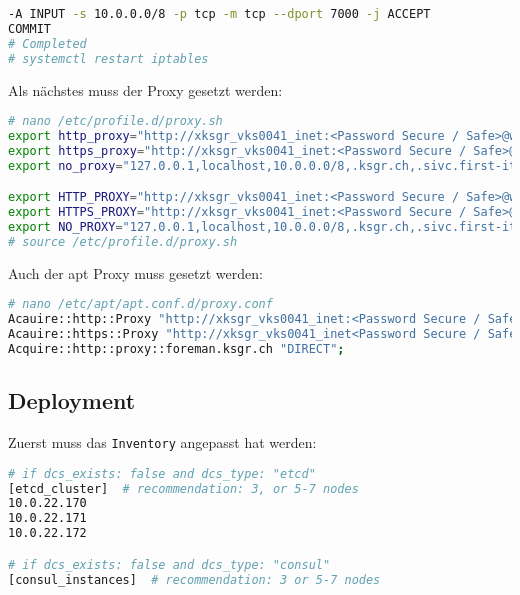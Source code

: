 \begin{flushleft}
\begin{lstlisting}[language=bash, caption=Testsystem - Firewall Settings,captionpos=b,label={lst:testsystem-installation-firewall},breaklines=true]
-A INPUT -s 10.0.0.0/8 -p tcp -m tcp --dport 7000 -j ACCEPT
COMMIT
# Completed
# systemctl restart iptables
    \end{lstlisting}
    Als nächstes muss der Proxy gesetzt werden:
    \lstset{style=gra_codestyle}
    \begin{lstlisting}[language=bash, caption=Testsystem - Proxy Settings,captionpos=b,label={lst:testsystem-installation-proxy-settings},breaklines=true]
# nano /etc/profile.d/proxy.sh
export http_proxy="http://xksgr_vks0041_inet:<Password Secure / Safe>@webproxy.sivc.first-it.ch:9090";
export https_proxy="http://xksgr_vks0041_inet:<Password Secure / Safe>@webproxy.sivc.first-it.ch:9090";
export no_proxy="127.0.0.1,localhost,10.0.0.0/8,.ksgr.ch,.sivc.first-it.ch"

export HTTP_PROXY="http://xksgr_vks0041_inet:<Password Secure / Safe>@webproxy.sivc.first-it.ch:9090";
export HTTPS_PROXY="http://xksgr_vks0041_inet:<Password Secure / Safe>@webproxy.sivc.first-it.ch:9090";
export NO_PROXY="127.0.0.1,localhost,10.0.0.0/8,.ksgr.ch,.sivc.first-it.ch"
# source /etc/profile.d/proxy.sh
    \end{lstlisting}
    Auch der apt Proxy muss gesetzt werden:
    \lstset{style=gra_codestyle}
    \begin{lstlisting}[language=bash, caption=Testsystem - apt-Proxy Settings,captionpos=b,label={lst:testsystem-installation-apt-proxy-settings},breaklines=true]
# nano /etc/apt/apt.conf.d/proxy.conf
Acauire::http::Proxy "http://xksgr_vks0041_inet:<Password Secure / Safe>@webproxy.sivc.first-it.ch:9090";
Acauire::https::Proxy "http://xksgr_vks0041_inet<Password Secure / Safe>@webproxy.sivc.first-it.ch:9090";
Acquire::http::proxy::foreman.ksgr.ch "DIRECT";
    \end{lstlisting}
    \subsection{Deployment}
    Zuerst muss das \texttt{Inventory} angepasst hat werden:
    \lstset{style=gra_codestyle}
    \begin{lstlisting}[language=bash, caption=Testsystem - Deployment - inventory,captionpos=b,label={lst:testsystem-deployment-inventory},breaklines=true]
# if dcs_exists: false and dcs_type: "etcd"
[etcd_cluster]  # recommendation: 3, or 5-7 nodes
10.0.22.170
10.0.22.171
10.0.22.172

# if dcs_exists: false and dcs_type: "consul"
[consul_instances]  # recommendation: 3 or 5-7 nodes


\end{lstlisting}
\end{flushleft}
